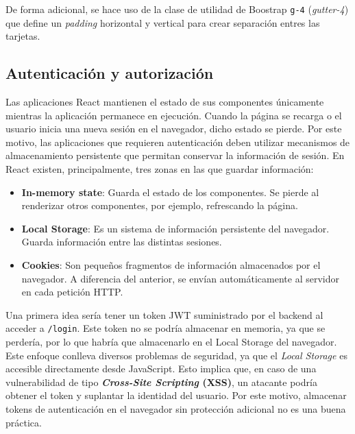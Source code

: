 \documentclass[11pt]{article}
\begin{document}
      De forma adicional, se hace uso de la clase de utilidad de Boostrap
      \texttt{g-4} (\textit{gutter-4}) que define un \textit{padding} horizontal y
      vertical para crear separación entres las tarjetas.

  \subsection{Autenticación y autorización}

      Las aplicaciones React mantienen el estado de sus componentes únicamente
      mientras la aplicación permanece en ejecución. Cuando la página se recarga o el
      usuario inicia una nueva sesión en el navegador, dicho estado se pierde. Por
      este motivo, las aplicaciones que requieren autenticación deben utilizar
      mecanismos de almacenamiento persistente que permitan conservar la información
      de sesión. En React existen, principalmente, tres zonas en las que guardar
      información:

      \begin{itemize}
          \item \textbf{In-memory state}: Guarda el estado de los componentes. Se pierde al renderizar otros componentes, por ejemplo, refrescando la página.
          \item \textbf{Local Storage}: Es un sistema de información persistente del navegador. Guarda información entre las distintas sesiones.
          \item \textbf{Cookies}: Son pequeños fragmentos de información almacenados por el navegador. A diferencia del anterior, se envían automáticamente al servidor en cada petición HTTP.
      \end{itemize}

      Una primera idea sería tener un token JWT suministrado por el backend al
      acceder a \texttt{/login}. Este token no se podría almacenar en memoria, ya que
      se perdería, por lo que habría que almacenarlo en el Local Storage del
      navegador. Este enfoque conlleva diversos problemas de seguridad, ya que el
      \textit{Local Storage} es accesible directamente desde JavaScript. Esto implica
      que, en caso de una vulnerabilidad de tipo \textbf{\textit{Cross-Site
              Scripting} (XSS)}, un atacante podría obtener el token y suplantar la identidad
      del usuario. Por este motivo, almacenar tokens de autenticación en el navegador
      sin protección adicional no es una buena práctica.
\end{document}
